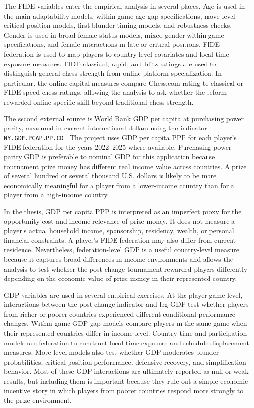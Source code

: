 The FIDE variables enter the empirical analysis in several places. Age is used in the main adaptability models, within-game age-gap specifications, move-level critical-position models, first-blunder timing models, and robustness checks. Gender is used in broad female-status models, mixed-gender within-game specifications, and female interactions in late or critical positions. FIDE federation is used to map players to country-level covariates and local-time exposure measures. FIDE classical, rapid, and blitz ratings are used to distinguish general chess strength from online-platform specialization. In particular, the online-capital measures compare Chess.com rating to classical or FIDE speed-chess ratings, allowing the analysis to ask whether the reform rewarded online-specific skill beyond traditional chess strength.

The second external source is World Bank GDP per capita at purchasing power parity, measured in current international dollars using the indicator \texttt{NY.GDP.PCAP.PP.CD} \citep{worldbank_gdp_ppp}. The project uses GDP per capita PPP for each player's FIDE federation for the years 2022--2025 where available. Purchasing-power-parity GDP is preferable to nominal GDP for this application because tournament prize money has different real income value across countries. A prize of several hundred or several thousand U.S. dollars is likely to be more economically meaningful for a player from a lower-income country than for a player from a high-income country.

In the thesis, GDP per capita PPP is interpreted as an imperfect proxy for the opportunity cost and income relevance of prize money. It does not measure a player's actual household income, sponsorship, residency, wealth, or personal financial constraints. A player's FIDE federation may also differ from current residence. Nevertheless, federation-level GDP is a useful country-level measure because it captures broad differences in income environments and allows the analysis to test whether the post-change tournament rewarded players differently depending on the economic value of prize money in their represented country.

GDP variables are used in several empirical exercises. At the player-game level, interactions between the post-change indicator and log GDP test whether players from richer or poorer countries experienced different conditional performance changes. Within-game GDP-gap models compare players in the same game when their represented countries differ in income level. Country-time and participation models use federation to construct local-time exposure and schedule-displacement measures. Move-level models also test whether GDP moderates blunder probabilities, critical-position performance, defensive recovery, and simplification behavior. Most of these GDP interactions are ultimately reported as null or weak results, but including them is important because they rule out a simple economic-incentive story in which players from poorer countries respond more strongly to the prize environment.

